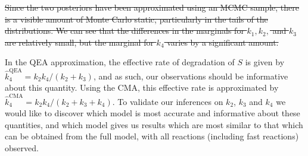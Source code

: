 \documentclass[final]{siamltex}
\providecommand{\DIFdel}[1]{{\protect\color{red}\sout{#1}}}                      %
\providecommand{\DIFaddbegin}{} %
\providecommand{\DIFdelbegin}{} %
\providecommand{\DIFdelend}{} %
\newcommand{\DIFscaledelfig}{0.5}
\newlength{\DIFdelgraphicswidth} %
\newlength{\DIFdelgraphicsheight} %
\newcommand{\DIFaddincludegraphics}[2][]{{\color{blue}\fbox{\DIFOincludegraphics[#1]{#2}}}} %
\newcommand{\DIFdelincludegraphics}[2][]{%
\sbox{\DIFdelgraphicsbox}{\DIFOincludegraphics[#1]{#2}}%
\settoboxwidth{\DIFdelgraphicswidth}{\DIFdelgraphicsbox} %
\settoboxtotalheight{\DIFdelgraphicsheight}{\DIFdelgraphicsbox} %
\scalebox{\DIFscaledelfig}{%
\parbox[b]{\DIFdelgraphicswidth}{\usebox{\DIFdelgraphicsbox}\\[-\baselineskip] \rule{\DIFdelgraphicswidth}{0em}}\llap{\resizebox{\DIFdelgraphicswidth}{\DIFdelgraphicsheight}{%
\setlength{\unitlength}{\DIFdelgraphicswidth}%
\begin{picture}(1,1)%
\thicklines\linethickness{2pt} %
{\color[rgb]{1,0,0}\put(0,0){\framebox(1,1){}}}%
{\color[rgb]{1,0,0}\put(0,0){\line( 1,1){1}}}%
{\color[rgb]{1,0,0}\put(0,1){\line(1,-1){1}}}%
\end{picture}%
}\hspace*{3pt}}} %
} %
\DeclareRobustCommand{\DIFaddbegin}{\DIFOaddbegin \let\includegraphics\DIFaddincludegraphics} %
\DeclareRobustCommand{\DIFdelbegin}{\DIFOdelbegin \let\includegraphics\DIFdelincludegraphics} %
\DeclareRobustCommand{\DIFdelend}{\DIFOaddend \let\includegraphics\DIFOincludegraphics} %
\begin{document}
\DIFdelbegin \DIFdel{Since the two posteriors have been approximated using an MCMC sample,
there is a visible amount of Monte Carlo static, particularly in the tails of
the distributions. We can see that the differences in the marginals
for $k_1, k_2,$ and $k_3$ are relatively small, but the marginal for
$k_4$ varies by a significant amount. 
}\DIFdelend %

In the QEA approximation, the effective rate of degradation of $S$ is
given by $\hat{k}_4^{\text{QEA}} = k_2k_4/(k_2+k_3)$, and as such, our
observations should be informative about this quantity. Using the CMA,
this effective rate is approximated by $\hat{k}_4^{\text{CMA}} =
k_2k_4/(k_2+k_3+k_4)$. To validate our inferences on $k_2$, $k_3$ and
$k_4$ we would like to discover which model is most accurate and
informative about these quantities, and which model gives us results
which are most similar to that which can be obtained from the full
model, with all reactions (including fast reactions) observed.

\DIFaddbegin 
\end{document}
